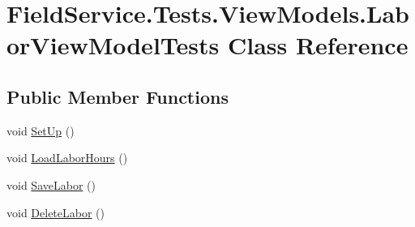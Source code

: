 \hypertarget{class_field_service_1_1_tests_1_1_view_models_1_1_labor_view_model_tests}{\section{Field\+Service.\+Tests.\+View\+Models.\+Labor\+View\+Model\+Tests Class Reference}
\label{class_field_service_1_1_tests_1_1_view_models_1_1_labor_view_model_tests}
}
\subsection*{Public Member Functions}
\begin{DoxyCompactItemize}
\item 
void \hyperlink{class_field_service_1_1_tests_1_1_view_models_1_1_labor_view_model_tests_abba76f38df875db1e01e0186050fe564}{Set\+Up} ()
\item 
void \hyperlink{class_field_service_1_1_tests_1_1_view_models_1_1_labor_view_model_tests_ad202df0b435409f7bc1fb40d16b5e4dd}{Load\+Labor\+Hours} ()
\item 
void \hyperlink{class_field_service_1_1_tests_1_1_view_models_1_1_labor_view_model_tests_ad0c6e11ee5b2104357707d0fe0d1bcfe}{Save\+Labor} ()
\item 
void \hyperlink{class_field_service_1_1_tests_1_1_view_models_1_1_labor_view_model_tests_aebda5fec2725dfb64dfc6cd4191ce0f7}{Delete\+Labor} ()
\end{DoxyCompactItemize}


